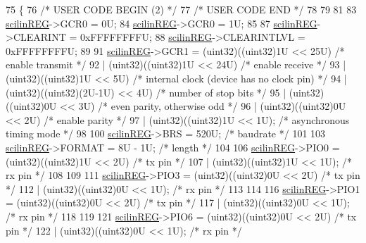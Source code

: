\begin{DoxyCode}
75 \{
76 \textcolor{comment}{/* USER CODE BEGIN (2) */}
77 \textcolor{comment}{/* USER CODE END */}
78 
79 
81 
83     \mbox{\hyperlink{reg__sci_8h_a389eea3394ad09b70e9d400b120186b4}{scilinREG}}->GCR0 = 0U;
84     \mbox{\hyperlink{reg__sci_8h_a389eea3394ad09b70e9d400b120186b4}{scilinREG}}->GCR0 = 1U;
85 
87     \mbox{\hyperlink{reg__sci_8h_a389eea3394ad09b70e9d400b120186b4}{scilinREG}}->CLEARINT    = 0xFFFFFFFFU;
88     \mbox{\hyperlink{reg__sci_8h_a389eea3394ad09b70e9d400b120186b4}{scilinREG}}->CLEARINTLVL = 0xFFFFFFFFU;
89 
91     \mbox{\hyperlink{reg__sci_8h_a389eea3394ad09b70e9d400b120186b4}{scilinREG}}->GCR1 = (uint32)((uint32)1U << 25U)  \textcolor{comment}{/* enable transmit */}
92                     | (uint32)((uint32)1U << 24U)  \textcolor{comment}{/* enable receive */}
93                     | (uint32)((uint32)1U << 5U)   \textcolor{comment}{/* internal clock (device has no clock pin) */}
94                     | (uint32)((uint32)(2U-1U) << 4U)  \textcolor{comment}{/* number of stop bits */}
95                     | (uint32)((uint32)0U << 3U)  \textcolor{comment}{/* even parity, otherwise odd */}
96                     | (uint32)((uint32)0U << 2U)  \textcolor{comment}{/* enable parity */}
97                     | (uint32)((uint32)1U << 1U);  \textcolor{comment}{/* asynchronous timing mode */}
98                     
100     \mbox{\hyperlink{reg__sci_8h_a389eea3394ad09b70e9d400b120186b4}{scilinREG}}->BRS = 520U;  \textcolor{comment}{/* baudrate */}
101 
103     \mbox{\hyperlink{reg__sci_8h_a389eea3394ad09b70e9d400b120186b4}{scilinREG}}->FORMAT = 8U - 1U;  \textcolor{comment}{/* length */}
104 
106     \mbox{\hyperlink{reg__sci_8h_a389eea3394ad09b70e9d400b120186b4}{scilinREG}}->PIO0 = (uint32)((uint32)1U << 2U)  \textcolor{comment}{/* tx pin */}
107                     | (uint32)((uint32)1U << 1U); \textcolor{comment}{/* rx pin */}
108 
109 
111     \mbox{\hyperlink{reg__sci_8h_a389eea3394ad09b70e9d400b120186b4}{scilinREG}}->PIO3 = (uint32)((uint32)0U << 2U)  \textcolor{comment}{/* tx pin */}
112                     | (uint32)((uint32)0U << 1U); \textcolor{comment}{/* rx pin */}
113 
114 
116     \mbox{\hyperlink{reg__sci_8h_a389eea3394ad09b70e9d400b120186b4}{scilinREG}}->PIO1 = (uint32)((uint32)0U << 2U)  \textcolor{comment}{/* tx pin */}
117                     | (uint32)((uint32)0U << 1U); \textcolor{comment}{/* rx pin */}
118 
119 
121     \mbox{\hyperlink{reg__sci_8h_a389eea3394ad09b70e9d400b120186b4}{scilinREG}}->PIO6 = (uint32)((uint32)0U << 2U)  \textcolor{comment}{/* tx pin */}
122                     | (uint32)((uint32)0U << 1U); \textcolor{comment}{/* rx pin */}

\end{DoxyCode}
